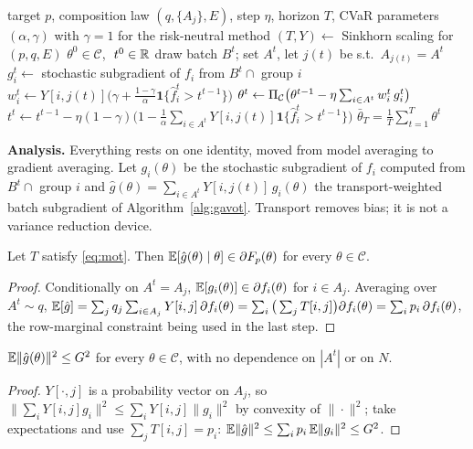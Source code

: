 \begin{algorithm}[t]
\caption{\avot{}: group-fair SGD by masked transport}
\label{alg:gavot}
\begin{algorithmic}[1]
\Require target $p$, composition law $(q,\{A_j\},E)$, step $\eta$, horizon $T$,
 CVaR parameters $(\alpha,\gamma)$ with $\gamma=1$ for the risk-neutral method
\State $(T,Y)\leftarrow$ Sinkhorn scaling for $(p,q,E)$ 
\State $\theta^0\in\mathcal{C}$, $\ t^0\in\mathbb{R}$
  \State draw batch $B^t$; set $A^t$, let $j(t)$ be s.t.\ $A_{j(t)}=A^t$
  \State $g^t_i \leftarrow$ stochastic subgradient of $f_i$ from $B^t\cap$ group $i$
  \State $w^t_i \leftarrow Y[i,j(t)]\big(\gamma+\tfrac{1-\gamma}{\alpha}\mathbf{1}\{\hat f^t_i>t^{t-1}\}\big)$
  \State $\theta^{t}\leftarrow\Pi_{\mathcal{C}}\big(\theta^{t-1}-\eta\sum_{i\in A^t}w^t_i\,g^t_i\big)$
  \State $t^{t}\leftarrow t^{t-1}-\eta(1-\gamma)\big(1-\tfrac{1}{\alpha}\sum_{i\in A^t}Y[i,j(t)]\mathbf{1}\{\hat f^t_i>t^{t-1}\}\big)$
\EndFor
\Ensure $\bar\theta_T=\frac{1}{T}\sum_{t=1}^{T}\theta^t$
\end{algorithmic}
\end{algorithm}

\noindent\textbf{Analysis.}
Everything rests on one identity, \cite[Lem.~1]{rahimi2025fedavot} moved from
model averaging to gradient averaging. Let $g_i(\theta)$ be the stochastic
subgradient of $f_i$ computed from $B^t\cap$ group $i$ and
$\hat g(\theta)=\sum_{i\in A^t}Y[i,j(t)]\,g_i(\theta)$ the transport-weighted
batch subgradient of Algorithm~\ref{alg:gavot}. Transport removes bias; it is
not a variance reduction device.

\begin{lemma}[Unbiasedness]
\label{lem:unbiased}
Let $T$ satisfy \eqref{eq:mot}. Then $\mathbb{E}[\hat g(\theta)\mid\theta]\in\partial F_p(\theta)$
for every $\theta\in\mathcal{C}$.
\end{lemma}
\begin{proof}
Conditionally on $A^t=A_j$, $\mathbb{E}[g_i(\theta)]\in\partial f_i(\theta)$ for
$i\in A_j$. Averaging over $A^t\sim q$,
$\mathbb{E}[\hat g]=\sum_j q_j\sum_{i\in A_j}Y[i,j]\,\partial f_i(\theta)
=\sum_i\big(\sum_j T[i,j]\big)\partial f_i(\theta)=\sum_i p_i\,\partial f_i(\theta)$,
the row-marginal constraint being used in the last step.
\end{proof}

\begin{lemma}
\label{lem:variance}
$\mathbb{E}\|\hat g(\theta)\|^2\le G^2$ for every $\theta\in\mathcal{C}$, with no
dependence on $|A^t|$ or on $N$.
\end{lemma}
\begin{proof}
$Y[\cdot,j]$ is a probability vector on $A_j$, so
$\|\sum_i Y[i,j]g_i\|^2\le\sum_i Y[i,j]\|g_i\|^2$ by convexity of
$\|\cdot\|^2$; take expectations and use $\sum_j T[i,j]=p_i$:
$\mathbb{E}\|\hat g\|^2\le\sum_i p_i\,\mathbb{E}\|g_i\|^2\le G^2$.
\end{proof}

